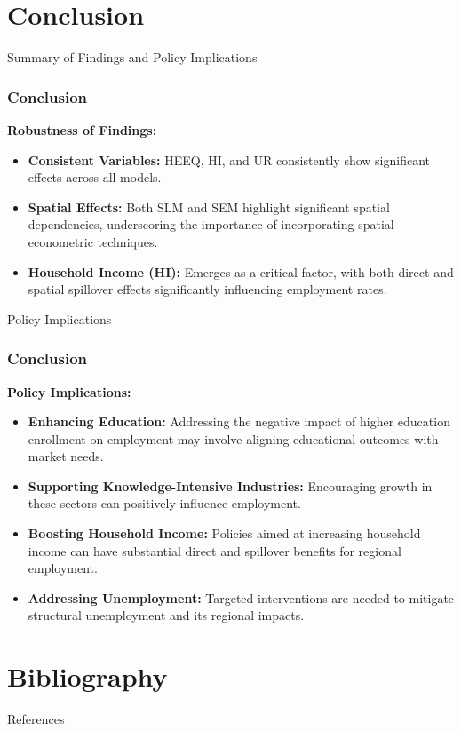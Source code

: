 \documentclass[10pt]{beamer}
\begin{document}
\section{Conclusion}
\begin{frame}{Summary of Findings and Policy Implications}
\frametitle{Conclusion}

\setlength{\parskip}{1em}  

\textbf{Robustness of Findings:}
\begin{itemize}
  \setlength\itemsep{1em}  %
  \item \textbf{Consistent Variables:} HEEQ, HI, and UR consistently show significant effects across all models.
  \item \textbf{Spatial Effects:} Both SLM and SEM highlight significant spatial dependencies, underscoring the importance of incorporating spatial econometric techniques.
  \item \textbf{Household Income (HI):} Emerges as a critical factor, with both direct and spatial spillover effects significantly influencing employment rates.
\end{itemize}

\end{frame}


\begin{frame}{Policy Implications}
\frametitle{Conclusion}

\setlength{\parskip}{1em}  

\textbf{Policy Implications:}
\begin{itemize}
  \setlength\itemsep{1em}
  \item \textbf{Enhancing Education:} Addressing the negative impact of higher education enrollment on employment may involve aligning educational outcomes with market needs.
  \item \textbf{Supporting Knowledge-Intensive Industries:} Encouraging growth in these sectors can positively influence employment.
  \item \textbf{Boosting Household Income:} Policies aimed at increasing household income can have substantial direct and spillover benefits for regional employment.
  \item \textbf{Addressing Unemployment:} Targeted interventions are needed to mitigate structural unemployment and its regional impacts.
\end{itemize}

\end{frame}


\section{Bibliography}
\begin{frame}{References}
\small
\printbibliography
\end{frame}
\end{document}
